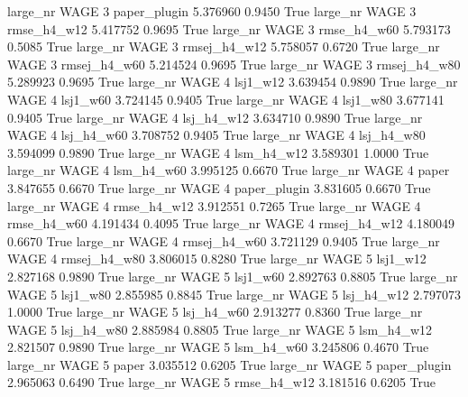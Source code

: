   large_nr     WAGE                 3 paper_plugin    5.376960      0.9450    True
  large_nr     WAGE                 3  rmse_h4_w12    5.417752      0.9695    True
  large_nr     WAGE                 3  rmse_h4_w60    5.793173      0.5085    True
  large_nr     WAGE                 3 rmsej_h4_w12    5.758057      0.6720    True
  large_nr     WAGE                 3 rmsej_h4_w60    5.214524      0.9695    True
  large_nr     WAGE                 3 rmsej_h4_w80    5.289923      0.9695    True
  large_nr     WAGE                 4     lsj1_w12    3.639454      0.9890    True
  large_nr     WAGE                 4     lsj1_w60    3.724145      0.9405    True
  large_nr     WAGE                 4     lsj1_w80    3.677141      0.9405    True
  large_nr     WAGE                 4   lsj_h4_w12    3.634710      0.9890    True
  large_nr     WAGE                 4   lsj_h4_w60    3.708752      0.9405    True
  large_nr     WAGE                 4   lsj_h4_w80    3.594099      0.9890    True
  large_nr     WAGE                 4   lsm_h4_w12    3.589301      1.0000    True
  large_nr     WAGE                 4   lsm_h4_w60    3.995125      0.6670    True
  large_nr     WAGE                 4        paper    3.847655      0.6670    True
  large_nr     WAGE                 4 paper_plugin    3.831605      0.6670    True
  large_nr     WAGE                 4  rmse_h4_w12    3.912551      0.7265    True
  large_nr     WAGE                 4  rmse_h4_w60    4.191434      0.4095    True
  large_nr     WAGE                 4 rmsej_h4_w12    4.180049      0.6670    True
  large_nr     WAGE                 4 rmsej_h4_w60    3.721129      0.9405    True
  large_nr     WAGE                 4 rmsej_h4_w80    3.806015      0.8280    True
  large_nr     WAGE                 5     lsj1_w12    2.827168      0.9890    True
  large_nr     WAGE                 5     lsj1_w60    2.892763      0.8805    True
  large_nr     WAGE                 5     lsj1_w80    2.855985      0.8845    True
  large_nr     WAGE                 5   lsj_h4_w12    2.797073      1.0000    True
  large_nr     WAGE                 5   lsj_h4_w60    2.913277      0.8360    True
  large_nr     WAGE                 5   lsj_h4_w80    2.885984      0.8805    True
  large_nr     WAGE                 5   lsm_h4_w12    2.821507      0.9890    True
  large_nr     WAGE                 5   lsm_h4_w60    3.245806      0.4670    True
  large_nr     WAGE                 5        paper    3.035512      0.6205    True
  large_nr     WAGE                 5 paper_plugin    2.965063      0.6490    True
  large_nr     WAGE                 5  rmse_h4_w12    3.181516      0.6205    True
